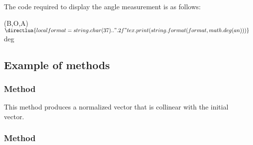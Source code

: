 The code required to display the angle measurement is as follows:

\begin{tkzexample}
  \tkzLabelAngle[pos=2](B,O,A){$\directlua{
  local format = string.char(37) .. ".2f"
  tex.print(string.format( format , math.deg(an)))}$ deg}
\end{tkzexample}



\subsection{Example of methods} %
\label{sub:example_of_methods}

\subsubsection{Method } %
\label{ssub:method_vector_normalize}
This method produces a normalized vector that is collinear with the initial vector.

 \begin{tkzexample}[latex = .5\textwidth]
 \end{tkzexample}



\subsubsection{Method } %
\label{ssub:method_vector_at}

 \begin{tkzexample}[latex = .5\textwidth]
 \end{tkzexample}
 
